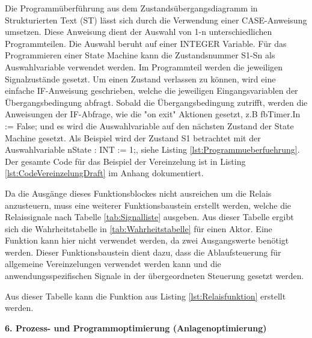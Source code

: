 Die Programmüberführung aus dem Zustandsübergangsdiagramm in Strukturierten Text (ST) lässt sich durch die Verwendung einer CASE-Anweisung umsetzen. Diese Anweisung dient der Auswahl von 1-n unterschiedlichen Programmteilen. Die Auswahl beruht auf einer INTEGER Variable. Für das Programmieren einer State Machine kann die Zustandsnummer S1-Sn als Auswahlvariable verwendet werden. Im Programmteil werden die jeweiligen Signalzustände gesetzt. Um einen Zustand verlassen zu können, wird eine einfache IF-Anweisung geschrieben, welche die jeweiligen Eingangsvariablen der Übergangsbedingung abfragt. Sobald die Übergangsbedingung zutrifft, werden die Anweisungen  der IF-Abfrage, wie die "on exit" Aktionen gesetzt, z.B \textrm{fbTimer.In := False;} und es wird die Auswahlvariable  auf den nächsten Zustand der State Machine gesetzt. Als Beispiel wird der Zustand S1 betrachtet mit der Auswahlvariable \textrm{nState : INT := 1;}, siehe Listing \ref{lst:Programmueberfuehrung}. Der gesamte Code für das Beispiel der Vereinzelung ist in Listing \ref{lst:CodeVereinzelungDraft} im Anhang dokumentiert.





 Da die Ausgänge dieses Funktionsblockes nicht ausreichen um die Relais anzusteuern, muss eine weiterer Funktionsbaustein erstellt werden, welche die Relaissignale nach Tabelle \ref{tab:Signalliste} ausgeben.  Aus dieser Tabelle  ergibt sich die Wahrheitstabelle in \ref{tab:Wahrheitstabelle} für einen Aktor. Eine Funktion kann hier nicht verwendet werden, da zwei Ausgangswerte benötigt werden. Dieser Funktionsbaustein dient dazu, dass die Ablaufsteuerung für allgemeine Vereinzelungen verwendet werden kann und die anwendungsspezifischen Signale in der übergeordneten Steuerung gesetzt werden. 




Aus dieser Tabelle kann die Funktion aus Listing \ref{lst:Relaisfunktion} erstellt werden. 




\textbf{6. Prozess- und Programmoptimierung (Anlagenoptimierung)}

